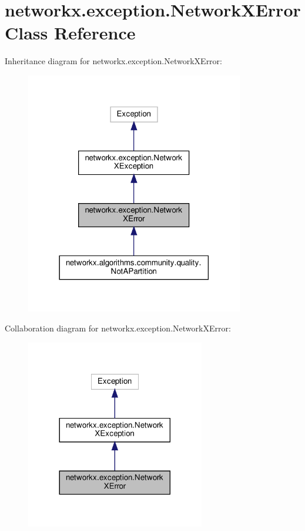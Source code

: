 \hypertarget{classnetworkx_1_1exception_1_1NetworkXError}{}\section{networkx.\+exception.\+Network\+X\+Error Class Reference}
\label{classnetworkx_1_1exception_1_1NetworkXError}


Inheritance diagram for networkx.\+exception.\+Network\+X\+Error\+:
\nopagebreak
\begin{figure}[H]
\begin{center}
\leavevmode
\includegraphics[width=270pt]{classnetworkx_1_1exception_1_1NetworkXError__inherit__graph}
\end{center}
\end{figure}


Collaboration diagram for networkx.\+exception.\+Network\+X\+Error\+:
\nopagebreak
\begin{figure}[H]
\begin{center}
\leavevmode
\includegraphics[width=221pt]{classnetworkx_1_1exception_1_1NetworkXError__coll__graph}
\end{center}
\end{figure}


